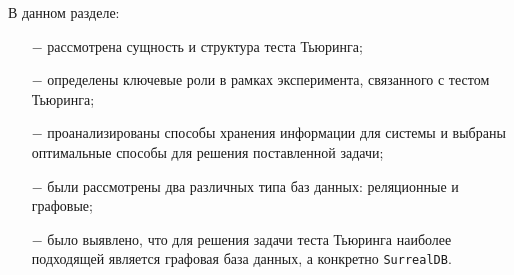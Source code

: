 В данном разделе:
\begin{itemize}
  \item[$-$] рассмотрена сущность и структура теста Тьюринга;
  \item[$-$] определены ключевые роли в рамках эксперимента, связанного с тестом Тьюринга;
  \item[$-$] проанализированы способы хранения информации для системы и выбраны оптимальные способы для решения поставленной задачи;
  \item[$-$] были рассмотрены два различных типа баз данных: реляционные и графовые;
  \item[$-$] было выявлено, что для решения задачи теста Тьюринга наиболее подходящей является графовая база данных, а конкретно \texttt{SurrealDB}.
\end{itemize}

